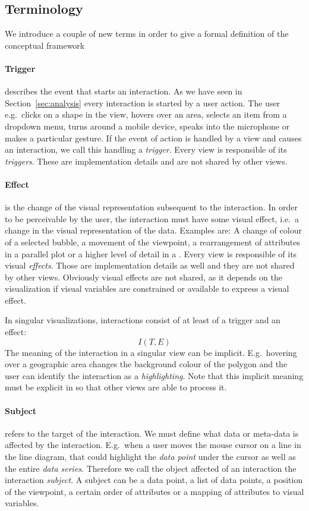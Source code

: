\subsection{Terminology}
We introduce a couple of new terms in order to give a formal definition of the conceptual framework

\paragraph{Trigger} describes the event that starts an interaction.
As we have seen in Section~\ref{sec:analysis} every interaction is started by a user action.
The user e.g.\ clicks on a shape in the view, hovers over an area, selects an item from a dropdown menu, turns around a mobile device, speaks into the microphone or makes a particular gesture.
If the event of action is handled by a view and causes an interaction, we call this handling a \emph{trigger}.
Every view is responsible of its \emph{triggers}.
These are implementation details and are not shared by other views.

\paragraph{Effect} is the change of the visual representation subsequent to the interaction.
In order to be perceivable by the user, the interaction must have some visual effect, i.e.\ a change in the visual representation of the data.
Examples are:
A change of colour of a selected bubble, a movement of the viewpoint, a rearrangement of attributes in a parallel plot or a higher level of detail in a \tmap{}.
Every view is responsible of its visual \emph{effects}.
Those are implementation details as well and they are not shared by other views.
Obviously visual effects are not shared, as it depends on the visualization if visual variables are constrained or available to express a visual effect.

In singular visualizations, interactions consist of at least of a trigger and an effect:
\begin{equation}
  I(T, E)
\end{equation}
The meaning of the interaction in a singular view can be implicit.
E.g.\ hovering over a geographic area changes the background colour of the polygon and the user can identify the interaction as a \emph{highlighting}.
Note that this implicit meaning must be explicit in \cmvs{} so that other views are able to process it.


\paragraph{Subject} refers to the target of the interaction.
We must define what data or meta-data is affected by the interaction.
E.g.\ when a user moves the mouse cursor on a line in the line diagram, that could highlight the \emph{data point} under the cursor as well as the entire \emph{data series}.
Therefore we call the object affected of an interaction the interaction \emph{subject}.
A subject can be a data point, a list of data points, a position of the viewpoint, a certain order of attributes or a mapping of attributes to visual variables.

